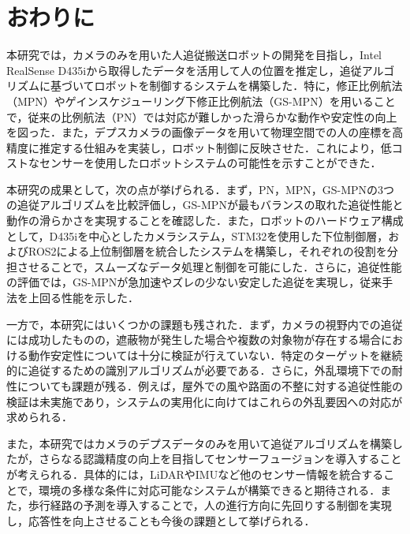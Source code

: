 \section{おわりに}
本研究では，カメラのみを用いた人追従搬送ロボットの開発を目指し，Intel RealSense D435iから取得したデータを活用して人の位置を推定し，追従アルゴリズムに基づいてロボットを制御するシステムを構築した．特に，修正比例航法（MPN）やゲインスケジューリング下修正比例航法（GS-MPN）を用いることで，従来の比例航法（PN）では対応が難しかった滑らかな動作や安定性の向上を図った．また，デプスカメラの画像データを用いて物理空間での人の座標を高精度に推定する仕組みを実装し，ロボット制御に反映させた．これにより，低コストなセンサーを使用したロボットシステムの可能性を示すことができた．

本研究の成果として，次の点が挙げられる．まず，PN，MPN，GS-MPNの3つの追従アルゴリズムを比較評価し，GS-MPNが最もバランスの取れた追従性能と動作の滑らかさを実現することを確認した．また，ロボットのハードウェア構成として，D435iを中心としたカメラシステム，STM32を使用した下位制御層，およびROS2による上位制御層を統合したシステムを構築し，それぞれの役割を分担させることで，スムーズなデータ処理と制御を可能にした．さらに，追従性能の評価では，GS-MPNが急加速やズレの少ない安定した追従を実現し，従来手法を上回る性能を示した．

一方で，本研究にはいくつかの課題も残された．まず，カメラの視野内での追従には成功したものの，遮蔽物が発生した場合や複数の対象物が存在する場合における動作安定性については十分に検証が行えていない．特定のターゲットを継続的に追従するための識別アルゴリズムが必要である．さらに，外乱環境下での耐性についても課題が残る．例えば，屋外での風や路面の不整に対する追従性能の検証は未実施であり，システムの実用化に向けてはこれらの外乱要因への対応が求められる．

また，本研究ではカメラのデプスデータのみを用いて追従アルゴリズムを構築したが，さらなる認識精度の向上を目指してセンサーフュージョンを導入することが考えられる．具体的には，LiDARやIMUなど他のセンサー情報を統合することで，環境の多様な条件に対応可能なシステムが構築できると期待される．また，歩行経路の予測を導入することで，人の進行方向に先回りする制御を実現し，応答性を向上させることも今後の課題として挙げられる．
